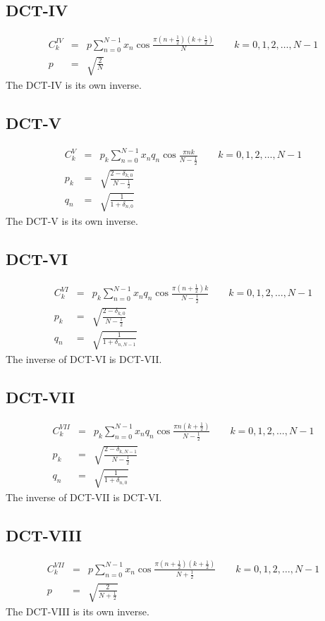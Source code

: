 \documentclass[12pt]{article}
\begin{document}
\subsection{DCT-IV}
\begin{eqnarray*}
C^{IV}_k&=&p \sum _{n=0}^{N-1} x_n \cos \frac{\pi \left(n+\frac{1}{2}\right) \left(k+\frac{1}{2}\right)}{N} \quad \quad k=0, 1, 2, \dots, N-1\\
p&=&\sqrt{\frac{2}{N}}
\end{eqnarray*}
The DCT-IV is its own inverse.

\subsection{DCT-V}
\begin{eqnarray*}
C^V_k&=&p_k \sum _{n=0}^{N-1} x_n q_n \cos \frac{\pi n k}{N-\frac{1}{2}} \quad \quad k=0, 1, 2, \dots, N-1\\
p_k&=&\sqrt{\frac{2-\delta _{k,0}}{N-\frac{1}{2}}}\\
q_n&=&\sqrt{\frac{1}{1+\delta _{n,0}}}
\end{eqnarray*}
The DCT-V is its own inverse.

\subsection{DCT-VI}
\begin{eqnarray*}
C^{VI}_k&=&p_k \sum _{n=0}^{N-1} x_n q_n \cos \frac{\pi \left(n+\frac{1}{2}\right) k}{N-\frac{1}{2}} \quad \quad k=0, 1, 2, \dots, N-1\\
p_k&=&\sqrt{\frac{2-\delta _{k,0}}{N-\frac{1}{2}}}\\
q_n&=&\sqrt{\frac{1}{1+\delta _{n,N-1}}}
\end{eqnarray*}
The inverse of DCT-VI is DCT-VII.

\subsection{DCT-VII}
\begin{eqnarray*}
C^{VII}_k&=&p_k \sum _{n=0}^{N-1} x_n q_n \cos \frac{\pi n \left(k+\frac{1}{2}\right)}{N-\frac{1}{2}} \quad \quad k=0, 1, 2, \dots, N-1\\
p_k&=&\sqrt{\frac{2-\delta _{k,N-1}}{N-\frac{1}{2}}}\\
q_n&=&\sqrt{\frac{1}{1+\delta _{n,0}}}
\end{eqnarray*}
The inverse of DCT-VII is DCT-VI.

\subsection{DCT-VIII}
\begin{eqnarray*}
C^{VII}_k&=&p \sum _{n=0}^{N-1} x_n \cos \frac{\pi \left(n+\frac{1}{2}\right) \left(k+\frac{1}{2}\right)}{N+\frac{1}{2}} \quad \quad k=0, 1, 2, \dots, N-1\\
p&=&\sqrt{\frac{2}{N+\frac{1}{2}}}
\end{eqnarray*}
The DCT-VIII is its own inverse.
\end{document}
